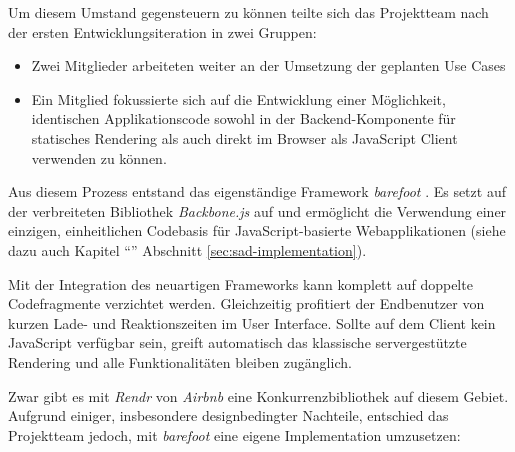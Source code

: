 Um diesem Umstand gegensteuern zu können teilte sich das Projektteam nach der ersten Entwicklungsiteration in zwei Gruppen:

\begin{itemize}
	\item Zwei Mitglieder arbeiteten weiter an der Umsetzung der geplanten Use Cases
	\item Ein Mitglied fokussierte sich auf die Entwicklung einer Möglichkeit, identischen Applikationscode sowohl in der Backend-Komponente für statisches Rendering als auch direkt im Browser als JavaScript Client verwenden zu können.
\end{itemize}

Aus diesem Prozess entstand das eigenständige Framework \emph{barefoot} \cite{Barefoot}. Es setzt auf der verbreiteten Bibliothek \emph{Backbone.js} \cite{Backbonejs} auf und ermöglicht die Verwendung einer einzigen, einheitlichen Codebasis für JavaScript-basierte Webapplikationen (siehe dazu auch Kapitel ``'' Abschnitt \ref{sec:sad-implementation}).

Mit der Integration des neuartigen Frameworks kann komplett auf doppelte Codefragmente verzichtet werden. Gleichzeitig profitiert der Endbenutzer von kurzen Lade- und Reaktionszeiten im User Interface. Sollte auf dem Client kein JavaScript verfügbar sein, greift automatisch das klassische servergestützte Rendering und alle Funktionalitäten bleiben zugänglich.

Zwar gibt es mit \emph{Rendr} von \emph{Airbnb} \cite{Rendr} eine Konkurrenzbibliothek auf diesem Gebiet. Aufgrund einiger, insbesondere designbedingter Nachteile, entschied das Projektteam jedoch, mit \emph{barefoot} eine eigene Implementation umzusetzen:

